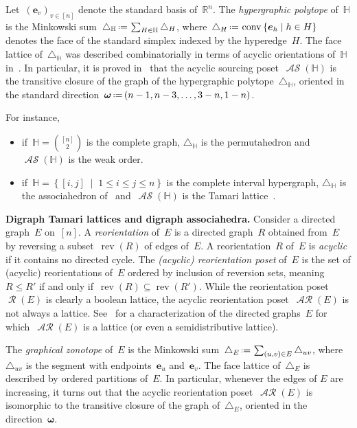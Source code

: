\documentclass{amsart}
\theoremstyle{definition}
\newcommand{\R}{\mathbb{R}} %
\renewcommand{\b}[1]{\boldsymbol{#1}} %
\renewcommand{\c}[1]{\mathcal{#1}} %
\newcommand{\set}[2]{\left\{ #1 \;\middle|\; #2 \right\}} %
\newcommand{\eqdef}{\mbox{\,\raisebox{0.2ex}{\scriptsize\ensuremath{\mathrm:}}\ensuremath{=}\,}} %
\newcommand{\simplex}{\triangle} %
\DeclareMathOperator{\conv}{conv} %
\newcommand{\para}[1]{\bigskip\noindent\textbf{#1}} %
\newcommand{\darkblue}{\color{darkblue}} %
\newcommand{\defn}[1]{\textsl{\darkblue #1}} %
\DeclareMathOperator{\Reori}{\c{R}}  %
\DeclareMathOperator{\AReori}{\c{AR}}  %
\DeclareMathOperator{\rev}{rev} %
\DeclareMathOperator{\ASour}{\mathcal{AS}}  %
\newcommand{\HH}{\mathbb H}  %
\begin{document}
Let~$(\b{e}_v)_{v \in [n]}$ denote the standard basis of~$\R^n$.
The \defn{hypergraphic polytope} of~$\HH$ is the Minkowski sum~$\simplex_\HH \eqdef \sum_{H \in \HH} \simplex_H$, where~$\simplex_H \eqdef \conv\set{\b{e}_h}{h \in H}$ denotes the face of the standard simplex indexed by the hyperedge~$H$.
The face lattice of~$\simplex_\HH$ was described combinatorially in terms of acyclic orientations of~$\HH$ in~\cite{BenedettiBergeronMachacek}.
In particular, it is proved in~\cite{Gelinas} that the acyclic sourcing poset~$\ASour(\HH)$ is the transitive closure of the graph of the hypergraphic polytope~$\simplex_\HH$, oriented in the standard direction~$\b{\omega} \eqdef (n-1, n-3, \dots, 3-n, 1-n)$.

For instance, 
\begin{itemize}
\item if~$\HH = \binom{[n]}{2}$ is the complete graph, $\simplex_\HH$ is the permutahedron and $\ASour(\HH)$ is the weak order.
\item if~$\HH = \set{[i,j]}{1 \le i \le j \le n}$ is the complete interval hypergraph, $\simplex_\HH$ is the associahedron of~\cite{ShniderSternberg,Loday} and~$\ASour(\HH)$ is the Tamari lattice~\cite{Tamari}.
\end{itemize}


\para{Digraph Tamari lattices and digraph associahedra.}
Consider a directed graph~$E$ on~$[n]$.
A \defn{reorientation} of~$E$ is a directed graph~$R$ obtained from~$E$ by reversing a subset~$\rev(R)$ of edges of~$E$.
A reorientation~$R$ of~$E$ is \defn{acyclic} if it contains no directed cycle.
The \defn{(acyclic) reorientation poset} of~$E$ is the set of (acyclic) reorientations of~$E$ ordered by inclusion of reversion sets, meaning~$R \le R'$ if and only if~$\rev(R) \subseteq \rev(R')$.
While the reorientation poset~$\Reori(E)$ is clearly a boolean lattice, the acyclic reorientation poset~$\AReori(E)$ is not always a lattice.
See~\cite{Pilaud-acyclicReorientationLattices} for a characterization of the directed graphs~$E$ for which~$\AReori(E)$ is a lattice (or even a semidistributive lattice).

The \defn{graphical zonotope} of~$E$ is the Minkowski sum~$\simplex_E \eqdef \sum_{(u,v) \in E} \simplex_{uv}$, where~$\simplex_{uv}$ is the segment with endpoints~$\b{e}_u$ and~$\b{e}_v$.
The face lattice of~$\simplex_E$ is described by ordered partitions of~$E$.
In particular, whenever the edges of $E$ are increasing, it turns out that the acyclic reorientation poset~$\AReori(E)$ is isomorphic to the transitive closure of the graph of~$\simplex_E$, oriented in the direction~$\b{\omega}$.
\end{document}
